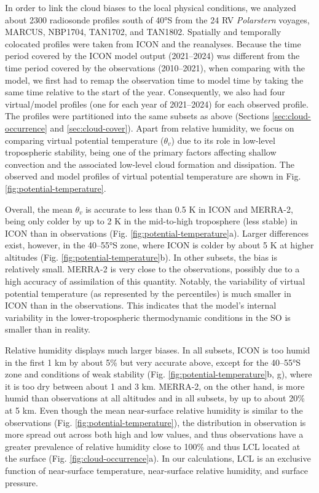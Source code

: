 \documentclass[draft]{agujournal2019}
\begin{document}
In order to link the cloud biases to the local physical conditions, we analyzed about 2300 radiosonde profiles south of 40°S from the 24 RV \emph{Polarstern} voyages, MARCUS, NBP1704, TAN1702, and TAN1802. Spatially and temporally colocated profiles were taken from ICON and the reanalyses. Because the time period covered by the ICON model output (2021--2024) was different from the time period covered by the observations (2010--2021), when comparing with the model, we first had to remap the observation time to model time by taking the same time relative to the start of the year. Consequently, we also had four virtual/model profiles (one for each year of 2021--2024) for each observed profile. The profiles were partitioned into the same subsets as above (Sections \ref{sec:cloud-occurrence} and \ref{sec:cloud-cover}). Apart from relative humidity, we focus on comparing virtual potential temperature ($\theta_v$) due to its role in low-level tropospheric stability, being one of the primary factors affecting shallow convection and the associated low-level cloud formation and dissipation. The observed and model profiles of virtual potential temperature are shown in Fig. \ref{fig:potential-temperature}.

Overall, the mean $\theta_v$ is accurate to less than 0.5 K in ICON and MERRA-2, being only colder by up to 2 K in the mid-to-high troposphere (less stable) in ICON than in observations (Fig. \ref{fig:potential-temperature}a). Larger differences exist, however, in the 40--55°S zone, where ICON is colder by about 5 K at higher altitudes (Fig. \ref{fig:potential-temperature}b). In other subsets, the bias is relatively small. MERRA-2 is very close to the observations, possibly due to a high accuracy of assimilation of this quantity. Notably, the variability of virtual potential temperature (as represented by the percentiles) is much smaller in ICON than in the observations. This indicates that the model's internal variability in the lower-tropospheric thermodynamic conditions in the SO is smaller than in reality.

Relative humidity displays much larger biases. In all subsets, ICON is too humid in the first 1 km by about 5\% but very accurate above, except for the 40--55°S zone and conditions of weak stability (Fig. \ref{fig:potential-temperature}b, g), where it is too dry between about 1 and 3 km. MERRA-2, on the other hand, is more humid than observations at all altitudes and in all subsets, by up to about 20\% at 5 km. Even though the mean near-surface relative humidity is similar to the observations (Fig. \ref{fig:potential-temperature}), the distribution in observation is more spread out across both high and low values, and thus observations have a greater prevalence of relative humidity close to 100\% and thus LCL located at the surface (Fig. \ref{fig:cloud-occurrence}a). In our calculations, LCL is an exclusive function of near-surface temperature, near-surface relative humidity, and surface pressure.
\end{document}
